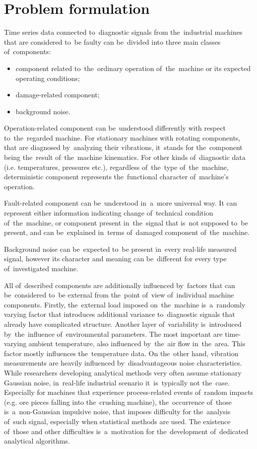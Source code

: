\chapter{Problem formulation}

Time series data connected to~diagnostic signals from the~industrial machines that are considered to~be faulty can be~divided into three main classes of~components:

\begin{itemize}
	\item component related to~the~ordinary operation of~the~machine or its expected operating conditions;
	\item damage-related component;
	\item background noise.
\end{itemize}

Operation-related component can be~understood differently with respect to~the~regarded machine. For stationary machines with rotating components, that are diagnosed by~analyzing their vibrations, it~stands for the~component being the~result of~the~machine kinematics. For other kinds of~diagnostic data (i.e. temperatures, pressures etc.), regardless of~the~type of~the~machine, deterministic component represents the~functional character of~machine's operation.

Fault-related component can be~understood in~a~more universal way. It can represent either information indicating change of~technical condition of~the~machine, or component present in~the~signal that is~not supposed to~be present, and can be~explained in~terms of~damaged component of~the~machine. 

Background noise can be~expected to~be present in~every real-life measured signal, however its character and meaning can be~different for every type of~investigated machine.

All of~described components are additionally influenced by~factors that can be~considered to~be external from the~point of~view of~individual machine components. Firstly, the~external load imposed on~the~machine is~a~randomly varying factor that introduces additional variance to~diagnostic signals that already have complicated structure. Another layer of~variability is~introduced by~the~influence of~environmental parameters. The most important are time-varying ambient temperature, also influenced by~the~air flow in~the~area. This factor mostly influences the~temperature data. On the~other hand, vibration measurements are heavily influenced by~disadvantageous noise characteristics. While researchers developing analytical methods very often assume stationary Gaussian noise, in~real-life industrial scenario it~is~typically not the~case. Especially for machines that experience process-related events of~random impacts (e.g. ore pieces falling into the~crushing machine), the~occurrence of~those is~a~non-Gaussian impulsive noise, that imposes difficulty for the~analysis of~such signal, especially when statistical methods are used. The existence of~those and other difficulties is~a~motivation for the~development of~dedicated analytical algorithms.

